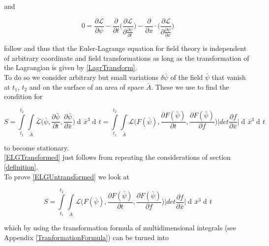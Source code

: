 \documentclass{article}
\DeclareMathOperator{\dd}{d\!}
\begin{document}
and

\begin{equation} \label{ELGUntransformed}
0 = \frac{\partial \mathcal{L}}{\partial \psi}
-\frac{\partial}{\partial t} \bigg( \frac{\partial \mathcal{L}}{\partial \frac{\partial \psi}{\partial t}} \bigg) 
-\frac{\partial}{\partial x} \cdot \bigg( \frac{\partial \mathcal{L}}{\partial \frac{\partial \psi}{\partial x}} \bigg) 
\end{equation}

follow and thus that the Euler-Lagrange equation for field theory is independent of arbitrary coordinate and field transformations as long as the transformation of the Lagrangian is given by \ref{LagrTransform}. \\

To do so we consider arbitrary but small variations $\delta \bar{\psi}$ of the field $\bar{\psi}$ that vanish at $t_1$, $t_2$ and on the surface of an area of space $\bar{A}$. These we use to find the condition for  

\begin{equation}
S = \int\limits_{t_1}^{t_2} \int\limits_{\bar{A}} \bar{\mathcal{L}}\bigg(\bar{\psi}, \frac{\partial \bar{\psi}}{\partial t}, \frac{\partial \bar{\psi}}{\partial \bar{x}}\bigg) \dd \bar{x}^3 \dd t 
= \int\limits_{t_1}^{t_2} \int\limits_{\bar{A}} \mathcal{L}\bigg(F(\bar{\psi}), \frac{\partial F(\bar{\psi})}{\partial t}, \frac{\partial F(\bar{\psi})}{\partial f}\bigg) 
\bigg| det \frac{\partial f}{\partial \bar{x}} \bigg| \dd \bar{x}^3 \dd t 
\end{equation}

to become stationary.\\

\ref{ELGTransformed} just follows from repeating the considerations of section \ref{definition}. \\

To prove \ref{ELGUntransformed} we look at 

\begin{equation}
S = \int\limits_{t_1}^{t_2} \int\limits_{\bar{A}} \mathcal{L}\bigg(F(\bar{\psi}), \frac{\partial F(\bar{\psi})}{\partial t}, \frac{\partial F(\bar{\psi})}{\partial f}\bigg) 
\bigg| det \frac{\partial f}{\partial \bar{x}} \bigg| \dd \bar{x}^3 \dd t 
\end{equation}

which by using the transformation formula of multidimensional integrals (see Appendix \ref{TranformationFormula}) can be turned into
\end{document}
